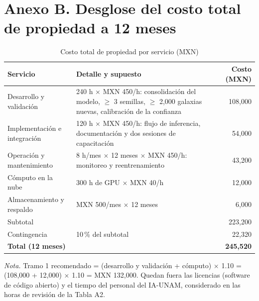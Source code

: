 \documentclass[letterpaper,11pt]{article}
\newcommand{\nota}[1]{{\footnotesize\textit{Nota.} #1\par}}
\begin{document}
\section*{Anexo B. Desglose del costo total de propiedad a 12 meses}
\renewcommand{\thetable}{B\arabic{table}}\setcounter{table}{0}
\begin{table}[!ht]
\caption{Costo total de propiedad por servicio (MXN)}
\small
\begin{tabular}{@{}p{3.6cm}p{9.4cm}r@{}}
\toprule
Servicio & Detalle y supuesto & Costo (MXN)\\
\midrule
Desarrollo y validación & 240 h $\times$ MXN 450/h: consolidación del modelo, $\geq$ 3 semillas, $\geq$ 2,000 galaxias nuevas, calibración de la confianza & 108,000\\
Implementación e integración & 120 h $\times$ MXN 450/h: flujo de inferencia, documentación y dos sesiones de capacitación & 54,000\\
Operación y mantenimiento & 8 h/mes $\times$ 12 meses $\times$ MXN 450/h: monitoreo y reentrenamiento & 43,200\\
Cómputo en la nube & 300 h de GPU $\times$ MXN 40/h & 12,000\\
Almacenamiento y respaldo & MXN 500/mes $\times$ 12 meses & 6,000\\
\midrule
Subtotal & & 223,200\\
Contingencia & 10\,\% del subtotal & 22,320\\
\textbf{Total (12 meses)} & & \textbf{245,520}\\
\bottomrule
\end{tabular}
\nota{Tramo 1 recomendado = (desarrollo y validación + cómputo) $\times$ 1.10 = (108,000 + 12,000) $\times$ 1.10 = MXN 132,000. Quedan fuera las licencias (software de código abierto) y el tiempo del personal del IA-UNAM, considerado en las horas de revisión de la Tabla A2.}
\end{table}
\end{document}
